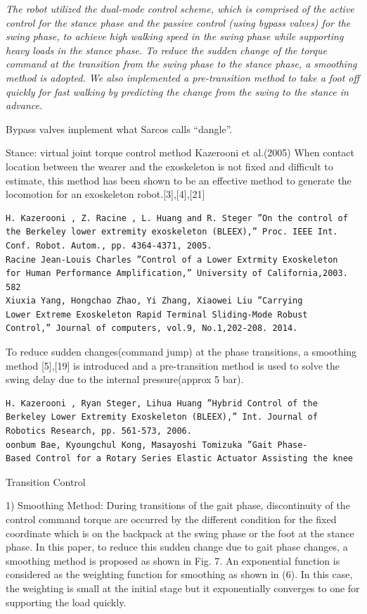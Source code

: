 \documentclass[letterpaper,12pt,fullpage]{article}
\begin{document}
{\it The robot utilized the dual-mode control scheme, which is
comprised of the active control for the stance phase and the
passive control (using bypass valves) for the swing phase, to achieve high walking
speed in the swing phase while supporting heavy loads in
the stance phase. To reduce the sudden change of the torque
command at the transition from the swing phase to the stance
phase, a smoothing method is adopted. We also implemented
a pre-transition method to take a foot off quickly for fast
walking by predicting the change from the swing to the stance
in advance.}~\cite{IEEE07222598}

Bypass valves implement what Sarcos calls ``dangle''.

Stance: virtual joint torque control method Kazerooni et al.(2005)
When contact location between the wearer and the
exoskeleton is not fixed and difficult to estimate, this method
has been shown to be an effective method to generate the
locomotion for an exoskeleton robot.[3],[4],[21]
\begin{verbatim}
H. Kazerooni , Z. Racine , L. Huang and R. Steger ”On the control of
the Berkeley lower extremity exoskeleton (BLEEX),” Proc. IEEE Int.
Conf. Robot. Autom., pp. 4364-4371, 2005.
Racine Jean-Louis Charles ”Control of a Lower Extrmity Exoskeleton
for Human Performance Amplification,” University of California,2003.
582
Xiuxia Yang, Hongchao Zhao, Yi Zhang, Xiaowei Liu ”Carrying
Lower Extreme Exoskeleton Rapid Terminal Sliding-Mode Robust
Control,” Journal of computers, vol.9, No.1,202-208. 2014.
\end{verbatim}

To reduce
sudden changes(command jump) at the phase transitions, a
smoothing method [5],[19] is introduced and a pre-transition
method is used to solve the swing delay due to the internal
pressure(approx 5 bar).
\begin{verbatim}
H. Kazerooni , Ryan Steger, Lihua Huang ”Hybrid Control of the
Berkeley Lower Extremity Exoskeleton (BLEEX),” Int. Journal of
Robotics Research, pp. 561-573, 2006.
oonbum Bae, Kyoungchul Kong, Masayoshi Tomizuka ”Gait Phase-
Based Control for a Rotary Series Elastic Actuator Assisting the knee
\end{verbatim}

Transition Control

1) Smoothing Method: During transitions of the gait
phase, discontinuity of the control command torque are
occurred by the different condition for the fixed coordinate
which is on the backpack at the swing phase or the foot at
the stance phase. In this paper, to reduce this sudden change
due to gait phase changes, a smoothing method is proposed
as shown in Fig. 7. An exponential function is considered
as the weighting function for smoothing as shown in (6).
In this case, the weighting is small at the initial stage but
it exponentially converges to one for supporting the load
quickly.
\end{document}
